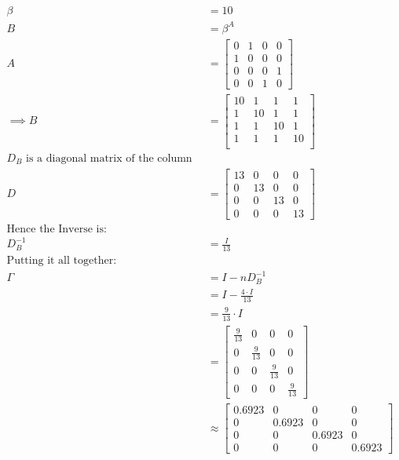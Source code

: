 \documentclass[12 pt]{article}
\begin{document}
$$
\begin{aligned}
    \beta &= 10 \\
    B &= \beta^A \\ 
    A &= 
    \begin{bmatrix} 
0& 1& 0& 0 \\
1& 0& 0& 0 \\
0& 0& 0& 1 \\
0& 0& 1& 0
    \end{bmatrix} \\
     \implies  
    B &= \begin{bmatrix} 
	 10 & 1 & 1 & 1 \\
	 1 & 10 & 1 & 1 \\
	 1 & 1 & 10 & 1 \\
	 1 & 1 & 1 & 10 \\
     \end{bmatrix}  \\
     \text{$D_B$ is a diagonal matrix of the column sums:}\\
     D &= \begin{bmatrix} 
	 13 & 0 & 0 & 0 \\
	 0 & 13 & 0 & 0 \\
	 0 & 0 & 13 & 0 \\
	 0 & 0 & 0 & 13 
     \end{bmatrix}  \\
     \text{Hence the Inverse is:}\\
	 D_B^{-1}&= \frac{I}{13}\\
     \text{Putting it all together:}\\
	 \Gamma &=  I - n D^{- 1}_B \\
	 &= I - \frac{4 \cdot I}{13} \\
	 &= \frac{9}{13} \cdot  I \\
	 &= \begin{bmatrix} 
	     \frac{9}{13} & 0 & 0 & 0 \\
	     0 & \frac{9}{13} & 0 & 0 \\
	     0 & 0 & \frac{9}{13} & 0 \\
	     0 & 0 & 0 &  \frac{9}{13}
	 \end{bmatrix}  \\
	 & \approx \begin{bmatrix} 
	     0.6923 & 0 & 0 & 0 \\
	     0 & 0.6923 & 0 & 0 \\
	     0 & 0 & 0.6923 & 0 \\
	     0 & 0 & 0 & 0.6923 
     \end{bmatrix} 

	 

\end{aligned}
$$
\end{document}
